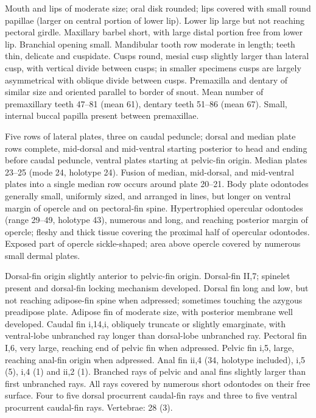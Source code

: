 \documentclass[12pt]{article}
\begin{document}
Mouth and lips of moderate size; oral disk rounded; lips covered with small round papillae (larger on central portion of lower lip). %
Lower lip large but not reaching pectoral girdle. %
Maxillary barbel short, with large distal portion free from lower lip. %
Branchial opening small. %
Mandibular tooth row moderate in length; teeth thin, delicate and cuspidate. %
Cusps round, mesial cusp slightly larger than lateral cusp, with vertical divide between cusps; in smaller specimens cusps are largely asymmetrical with oblique divide between cusps. %
Premaxilla and dentary of similar size and oriented parallel to border of snout. %
Mean number of premaxillary teeth 47--81 (mean 61), dentary teeth 51--86 (mean 67). %
Small, internal buccal papilla present between premaxillae.%

Five rows of lateral plates, three on caudal peduncle; dorsal and median plate rows complete, mid-dorsal and mid-ventral starting posterior to head and ending before caudal peduncle, ventral plates starting at pelvic-fin origin. %
Median plates 23--25 (mode 24, holotype 24). %
Fusion of median, mid-dorsal, and mid-ventral plates into a single median row occurs around plate 20--21. %
Body plate odontodes generally small, uniformly sized, and arranged in lines, but longer on ventral margin of opercle and on pectoral-fin spine. %
Hypertrophied opercular odontodes (range 29--49, holotype 43), numerous and long, and reaching posterior margin of opercle; fleshy and thick tissue covering the proximal half of opercular odontodes. %
Exposed part of opercle sickle-shaped; area above opercle covered by numerous small dermal plates.%

Dorsal-fin origin slightly anterior to pelvic-fin origin. %
Dorsal-fin II,7; spinelet present and dorsal-fin locking mechanism developed. %
Dorsal fin long and low, but not reaching adipose-fin spine when adpressed; sometimes touching the azygous preadipose plate. %
Adipose fin of moderate size, with posterior membrane well developed. %
Caudal fin i,14,i, obliquely truncate or slightly emarginate, with ventral-lobe unbranched ray longer than dorsal-lobe unbranched ray. %
Pectoral fin I,6, very large, reaching end of pelvic fin when adpressed. %
Pelvic fin i,5, large, reaching anal-fin origin when adpressed. %
Anal fin ii,4 (34, holotype included), i,5 (5), i,4 (1) and ii,2 (1). %
Branched rays of pelvic and anal fins slightly larger than first unbranched rays. %
All rays covered by numerous short odontodes on their free surface. %
Four to five dorsal procurrent caudal-fin rays and three to five ventral procurrent caudal-fin rays. Vertebrae: 28 (3).\\%
\bigskip
\end{document}
